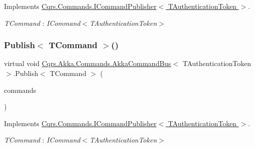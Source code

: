Implements \hyperlink{interfaceCqrs_1_1Commands_1_1ICommandPublisher_aeeb487ad5686d9c44d214b1daaf7833a}{Cqrs.\+Commands.\+I\+Command\+Publisher$<$ T\+Authentication\+Token $>$}.

\begin{Desc}
\item[Type Constraints]\begin{description}
\item[{\em T\+Command} : {\em I\+Command$<$T\+Authentication\+Token$>$}]\end{description}
\end{Desc}
\mbox{\label{classCqrs_1_1Akka_1_1Commands_1_1AkkaCommandBus_ab52365375febd74ac078e97af6e6cd24}} 
\subsubsection{\texorpdfstring{Publish$<$ T\+Command $>$()}{Publish< TCommand >()}\hspace{0.1cm}{\footnotesize\ttfamily [2/2]}}
{\footnotesize\ttfamily virtual void \hyperlink{classCqrs_1_1Akka_1_1Commands_1_1AkkaCommandBus}{Cqrs.\+Akka.\+Commands.\+Akka\+Command\+Bus}$<$ T\+Authentication\+Token $>$.Publish$<$ T\+Command $>$ (\begin{DoxyParamCaption}\item[{I\+Enumerable$<$ T\+Command $>$}]{commands }\end{DoxyParamCaption})\hspace{0.3cm}{\ttfamily [virtual]}}



Implements \hyperlink{interfaceCqrs_1_1Commands_1_1ICommandPublisher_af0f033c0b949e5650032e4f00b11b595}{Cqrs.\+Commands.\+I\+Command\+Publisher$<$ T\+Authentication\+Token $>$}.

\begin{Desc}
\item[Type Constraints]\begin{description}
\item[{\em T\+Command} : {\em I\+Command$<$T\+Authentication\+Token$>$}]\end{description}
\end{Desc}
\mbox{\label{classCqrs_1_1Akka_1_1Commands_1_1AkkaCommandBus_a8ed33fb315493d52470bc3bc2bf076f2}} 
